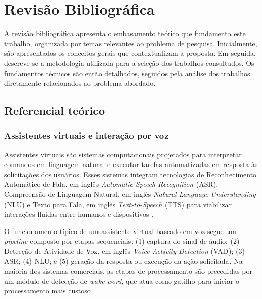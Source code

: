 \documentclass[
    12pt,                %
    openright,           %
    oneside,             %
    a4paper,             %
    english,             %
    brazil               %
]{abntex2}
\begin{document}
\chapter{Revisão Bibliográfica}
\label{cap:revisao}

A revisão bibliográfica apresenta o embasamento teórico que fundamenta este trabalho, organizada por temas relevantes ao problema de pesquisa. Inicialmente, são apresentados os conceitos gerais que contextualizam a proposta. Em seguida, descreve-se a metodologia utilizada para a seleção dos trabalhos consultados. Os fundamentos técnicos são então detalhados, seguidos pela análise dos trabalhos diretamente relacionados ao problema abordado.

\section{Referencial teórico}
\label{sec:referencial}

\subsection{Assistentes virtuais e interação por voz}

Assistentes virtuais são sistemas computacionais projetados para interpretar comandos em linguagem natural e executar tarefas automatizadas em resposta às solicitações dos usuários. Esses sistemas integram tecnologias de Reconhecimento Automático de Fala, em inglês \textit{Automatic Speech Recognition} (ASR), Compreensão de Linguagem Natural, em inglês \textit{Natural Language Understanding} (NLU) e Texto para Fala, em inglês \textit{Text-to-Speech} (TTS) para viabilizar interações fluidas entre humanos e dispositivos \cite{Jurafsky2024}.

O funcionamento típico de um assistente virtual baseado em voz segue um \textit{pipeline} composto por etapas sequenciais: (1) captura do sinal de áudio; (2) Detecção de Atividade de Voz, em inglês \textit{Voice Activity Detection} (VAD); (3) ASR; (4) NLU; e (5) geração da resposta ou execução da ação solicitada. Na maioria dos sistemas comerciais, as etapas de processamento são precedidas por um módulo de detecção de \textit{wake-word}, que atua como gatilho para iniciar o processamento mais custoso \cite{Garg2021}.
\end{document}
